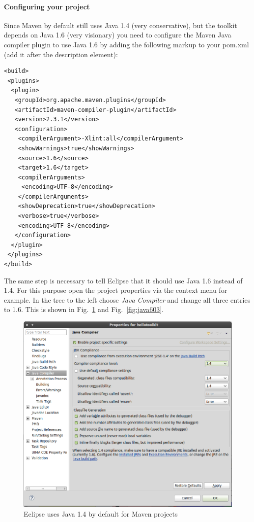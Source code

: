 \documentclass[a4paper,twoside]{book}      %
\begin{document}
\paragraph{Configuring your project} Since Maven by default still uses Java 1.4 (very conservative), but the toolkit depends on Java 1.6 (very visionary) you need to configure the Maven Java compiler plugin to use Java 1.6 by adding the following markup to your pom.xml (add it after the description element):
\begin{verbatim}
<build>
 <plugins>
  <plugin>
   <groupId>org.apache.maven.plugins</groupId>
   <artifactId>maven-compiler-plugin</artifactId>
   <version>2.3.1</version>
   <configuration>
    <compilerArgument>-Xlint:all</compilerArgument>
    <showWarnings>true</showWarnings>
    <source>1.6</source>
    <target>1.6</target>
    <compilerArguments>
     <encoding>UTF-8</encoding>
    </compilerArguments>
    <showDeprecation>true</showDeprecation>
    <verbose>true</verbose>
    <encoding>UTF-8</encoding>
   </configuration>
  </plugin>
 </plugins>
</build>
\end{verbatim}
The same step is necessary to tell Eclipse that it should use Java 1.6 instead of 1.4. For this purpose open the project properties via the context menu for example. In the tree to the left choose \textit{Java Compiler} and change all three entries to 1.6. This is shown in Fig.~\ref{fig:java602} and Fig.~\ref{fig:java603}.
\begin{figure}
\centering
\includegraphics[width=\textwidth]{img/ht08.png}
\caption{Eclipse uses Java 1.4 by default for Maven projects}
\label{fig:java602}
\end{figure}
\end{document}
